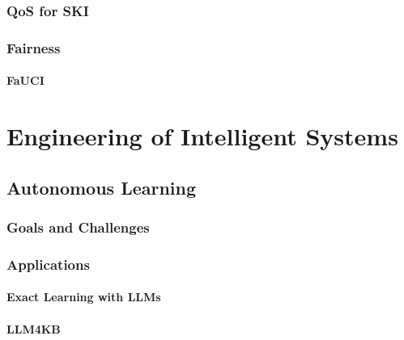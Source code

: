 \documentclass[12pt,a4paper,openright,twoside]{book}
\begin{document}
\section{\Acl{QoS} for \ac{SKI}}\label{sec:qos}

\section{Fairness}\label{sec:fairness}

\subsection{\Acl{FaUCI}}\label{subsec:fauci}



\part{Engineering of Intelligent Systems}\label{part:engineering-of-intelligent-systems}


\chapter{Autonomous Learning}\label{ch:autonomous-learning}

\section{Goals and Challenges}\label{sec:goals-and-challenges}

\section{Applications}\label{sec:applications}

\subsection{Exact Learning with \acp{LLM}}\label{subsec:exact-learning-with-ac{llm}}

\subsection{\Acl{LLM4KB}}\label{subsec:llm4kb}
\end{document}
